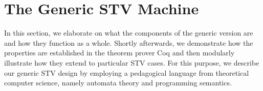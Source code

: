 \documentclass{llncs}
\begin{document}




\section{The Generic STV Machine}       
%

In this section, we elaborate on what the components of the generic version are and how they function as a whole. Shortly afterwards, we demonstrate how the properties  are established in the theorem prover Coq and then modularly illustrate how they extend to particular STV cases. For this purpose, we describe our generic STV design by employing a pedagogical language from theoretical computer science, namely automata theory and programming semantics.  

\end{document}
